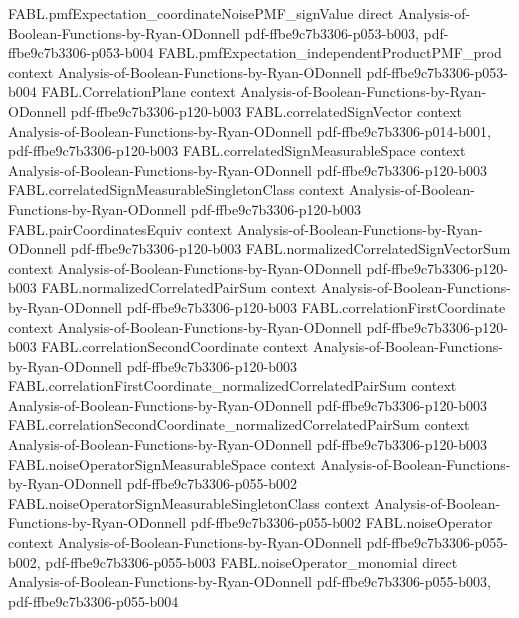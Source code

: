 \begin{theorem}
  {FABL.pmfExpectation_coordinateNoisePMF_signValue}
  {direct}
  {Analysis-of-Boolean-Functions-by-Ryan-ODonnell}
  {pdf-ffbe9c7b3306-p053-b003,
    pdf-ffbe9c7b3306-p053-b004}
\proofstep
  {FABL.pmfExpectation_independentProductPMF_prod}
  {context}
  {Analysis-of-Boolean-Functions-by-Ryan-ODonnell}
  {pdf-ffbe9c7b3306-p053-b004}
\proofstep
  {FABL.CorrelationPlane}
  {context}
  {Analysis-of-Boolean-Functions-by-Ryan-ODonnell}
  {pdf-ffbe9c7b3306-p120-b003}
\proofstep
  {FABL.correlatedSignVector}
  {context}
  {Analysis-of-Boolean-Functions-by-Ryan-ODonnell}
  {pdf-ffbe9c7b3306-p014-b001,
    pdf-ffbe9c7b3306-p120-b003}
\proofstep
  {FABL.correlatedSignMeasurableSpace}
  {context}
  {Analysis-of-Boolean-Functions-by-Ryan-ODonnell}
  {pdf-ffbe9c7b3306-p120-b003}
\proofstep
  {FABL.correlatedSignMeasurableSingletonClass}
  {context}
  {Analysis-of-Boolean-Functions-by-Ryan-ODonnell}
  {pdf-ffbe9c7b3306-p120-b003}
\proofstep
  {FABL.pairCoordinatesEquiv}
  {context}
  {Analysis-of-Boolean-Functions-by-Ryan-ODonnell}
  {pdf-ffbe9c7b3306-p120-b003}
\proofstep
  {FABL.normalizedCorrelatedSignVectorSum}
  {context}
  {Analysis-of-Boolean-Functions-by-Ryan-ODonnell}
  {pdf-ffbe9c7b3306-p120-b003}
\proofstep
  {FABL.normalizedCorrelatedPairSum}
  {context}
  {Analysis-of-Boolean-Functions-by-Ryan-ODonnell}
  {pdf-ffbe9c7b3306-p120-b003}
\proofstep
  {FABL.correlationFirstCoordinate}
  {context}
  {Analysis-of-Boolean-Functions-by-Ryan-ODonnell}
  {pdf-ffbe9c7b3306-p120-b003}
\proofstep
  {FABL.correlationSecondCoordinate}
  {context}
  {Analysis-of-Boolean-Functions-by-Ryan-ODonnell}
  {pdf-ffbe9c7b3306-p120-b003}
\proofstep
  {FABL.correlationFirstCoordinate_normalizedCorrelatedPairSum}
  {context}
  {Analysis-of-Boolean-Functions-by-Ryan-ODonnell}
  {pdf-ffbe9c7b3306-p120-b003}
\proofstep
  {FABL.correlationSecondCoordinate_normalizedCorrelatedPairSum}
  {context}
  {Analysis-of-Boolean-Functions-by-Ryan-ODonnell}
  {pdf-ffbe9c7b3306-p120-b003}
\proofstep
  {FABL.noiseOperatorSignMeasurableSpace}
  {context}
  {Analysis-of-Boolean-Functions-by-Ryan-ODonnell}
  {pdf-ffbe9c7b3306-p055-b002}
\proofstep
  {FABL.noiseOperatorSignMeasurableSingletonClass}
  {context}
  {Analysis-of-Boolean-Functions-by-Ryan-ODonnell}
  {pdf-ffbe9c7b3306-p055-b002}
\proofstep
  {FABL.noiseOperator}
  {context}
  {Analysis-of-Boolean-Functions-by-Ryan-ODonnell}
  {pdf-ffbe9c7b3306-p055-b002,
    pdf-ffbe9c7b3306-p055-b003}
\proofstep
  {FABL.noiseOperator_monomial}
  {direct}
  {Analysis-of-Boolean-Functions-by-Ryan-ODonnell}
  {pdf-ffbe9c7b3306-p055-b003,
    pdf-ffbe9c7b3306-p055-b004}

\end{theorem}
